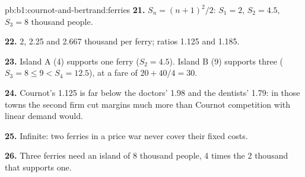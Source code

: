 \begin{solution}{pb:b1:cournot-and-bertrand:ferries}
\textbf{21.} $S_n = (n + 1)^2/2$: $S_1 = 2$, $S_2 = 4.5$, $S_3 = 8$ thousand people.

\textbf{22.} 2, 2.25 and 2.667 thousand per ferry; ratios 1.125 and 1.185.

\textbf{23.} Island A (4) supports one ferry ($S_2 = 4.5$). Island B (9) supports three
($S_3 = 8 \le 9 < S_4 = 12.5$), at a fare of $20 + 40/4 = 30$.

\textbf{24.} Cournot's 1.125 is far below the doctors' 1.98 and the dentists'
1.79: in those towns the second firm cut margins much more than Cournot
competition with linear demand would.

\textbf{25.} Infinite: two ferries in a price war never cover their fixed
costs.

\textbf{26.} Three ferries need an island of 8 thousand people, 4 times the 2
thousand that supports one.
\end{solution}
